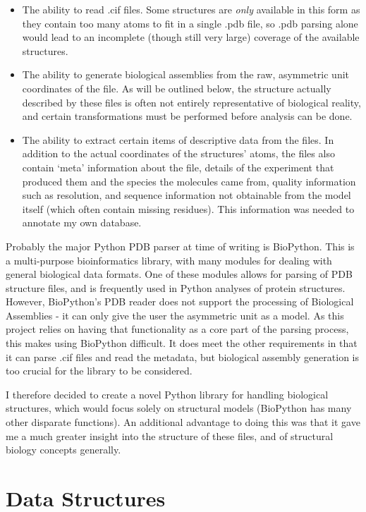 \begin{itemize}
  \item The ability to read .cif files. Some structures are \emph{only} available in this form as they contain too many atoms to fit in a single .pdb file, so .pdb parsing alone would lead to an incomplete (though still very large) coverage of the available structures.
  \item The ability to generate biological assemblies from the raw, asymmetric unit coordinates of the file. As will be outlined below, the structure actually described by these files is often not entirely representative of biological reality, and certain transformations must be performed before analysis can be done.
  \item The ability to extract certain items of descriptive data from the files. In addition to the actual coordinates of the structures' atoms, the files also contain `meta' information about the file, details of the experiment that produced them and the species the molecules came from, quality information such as resolution, and sequence information not obtainable from the model itself (which often contain missing residues). This information was needed to annotate my own database.
\end{itemize}

Probably the major Python PDB parser at time of writing is BioPython. This is a multi-purpose bioinformatics library, with many modules for dealing with general biological data formats. One of these modules allows for parsing of PDB structure files, and is frequently used in Python analyses of protein structures. However, BioPython's PDB reader does not support the processing of Biological Assemblies - it can only give the user the asymmetric unit as a model. As this project relies on having that functionality as a core part of the parsing process, this makes using BioPython difficult. It does meet the other requirements in that it can parse .cif files and read the metadata, but biological assembly generation is too crucial for the library to be considered.

I therefore decided to create a novel Python library for handling biological structures, which would focus solely on structural models (BioPython has many other disparate functions). An additional advantage to doing this was that it gave me a much greater insight into the structure of these files, and of structural biology concepts generally.

\section{Data Structures}

